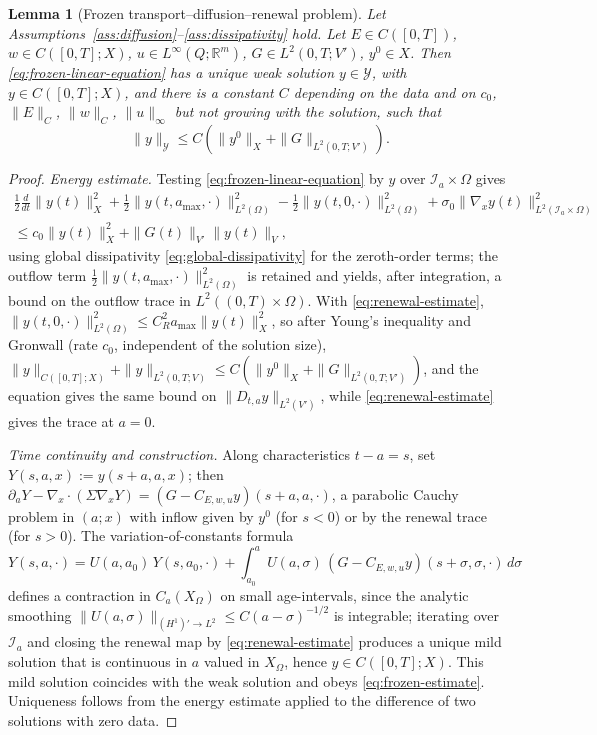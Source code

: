 \documentclass[pdflatex,sn-mathphys-num]{sn-jnl}
\theoremstyle{plain}
\newtheorem{lemma}[theorem]{Lemma}
\theoremstyle{definition}
\theoremstyle{remark}
\newcommand{\R}{\mathbb R}
\begin{document}
\begin{lemma}[Frozen transport--diffusion--renewal problem]
\label{lem:frozen-linear-wp}
Let Assumptions~\ref{ass:diffusion}--\ref{ass:dissipativity} hold.
Let $E\in C([0,T])$, $w\in C([0,T];X)$, $u\in L^\infty(Q;\R^m)$,
$G\in L^2(0,T;V')$, $y^0\in X$. Then \eqref{eq:frozen-linear-equation} has a
unique weak solution $y\in\mathcal Y$, with $y\in C([0,T];X)$, and there is a
constant $C$ depending on the data and on $c_0$, $\|E\|_{C}$, $\|w\|_C$,
$\|u\|_\infty$ but \emph{not growing with the solution}, such that
\begin{equation}
\label{eq:frozen-estimate}
\|y\|_{\mathcal Y}
\le
C
\left(
\|y^0\|_X
+
\|G\|_{L^2(0,T;V')}
\right).
\end{equation}
\end{lemma}

\begin{proof}
\emph{Energy estimate.} Testing \eqref{eq:frozen-linear-equation} by $y$ over
$ \mathcal I_a\times \Omega$ gives
\begin{multline*}
\frac12\frac{d}{dt}\|y(t)\|_X^2
+
\frac12\|y(t,a_{\max},\cdot)\|_{L^2(\Omega)}^2
-
\frac12\|y(t,0,\cdot)\|_{L^2(\Omega)}^2
+
\sigma_0\|\nabla_x y(t)\|_{L^2(\mathcal I_a\times\Omega)}^2
\\
\le
c_0\|y(t)\|_X^2
+
\|G(t)\|_{V'}\|y(t)\|_V ,
\end{multline*}
using global dissipativity \eqref{eq:global-dissipativity} for the
zeroth-order terms; the outflow term
$\tfrac12\|y(t,a_{\max},\cdot)\|^2_{L^2(\Omega)}$ is retained and yields, after
integration, a bound on the outflow trace in $L^2((0,T)\times\Omega)$. With
\eqref{eq:renewal-estimate}, $\|y(t,0,\cdot)\|^2_{L^2(\Omega)}\le
C_R^2a_{\max}\|y(t)\|_X^2$, so after Young's inequality and Gronwall (rate
$c_0$, independent of the solution size),
$\displaystyle \|y\|_{C([0,T];X)}+\|y\|_{L^2(0,T;V)}
\le
C(\|y^0\|_X+\|G\|_{L^2(0,T;V')})$,
and the equation gives the same bound on $\|D_{t,a}y\|_{L^2(V')}$, while
\eqref{eq:renewal-estimate} gives the trace at $a=0$.

\emph{Time continuity and construction.} Along characteristics $t-a=s$, set
$Y(s,a,x):=y(s+a,a,x)$; then $\partial_a Y-\nabla_x\cdot(\Sigma\nabla_x Y)=
(G-C_{E,w,u}y)(s+a,a,\cdot)$, a parabolic Cauchy problem in $(a;x)$ with
inflow given by $y^0$ (for $s<0$) or by the renewal trace (for $s>0$). The
variation-of-constants formula
\[
Y(s,a,\cdot)
=
U(a,a_0)\,Y(s,a_0,\cdot)
+
\int_{a_0}^a U(a,\sigma)\,(G-C_{E,w,u}y)(s+\sigma,\sigma,\cdot)\,d\sigma
\]
defines a contraction in $C_a(X_\Omega)$ on small age-intervals, since the
analytic smoothing $\|U(a,\sigma)\|_{(H^1)'\to L^2}\le C(a-\sigma)^{-1/2}$ is
integrable; iterating over $\mathcal I_a$ and closing the renewal map by
\eqref{eq:renewal-estimate} produces a unique mild solution that is continuous
in $a$ valued in $X_\Omega$, hence $y\in C([0,T];X)$. This mild solution
coincides with the weak solution and obeys \eqref{eq:frozen-estimate}.
Uniqueness follows from the energy estimate applied to the difference of two
solutions with zero data.
\end{proof}
\end{document}
